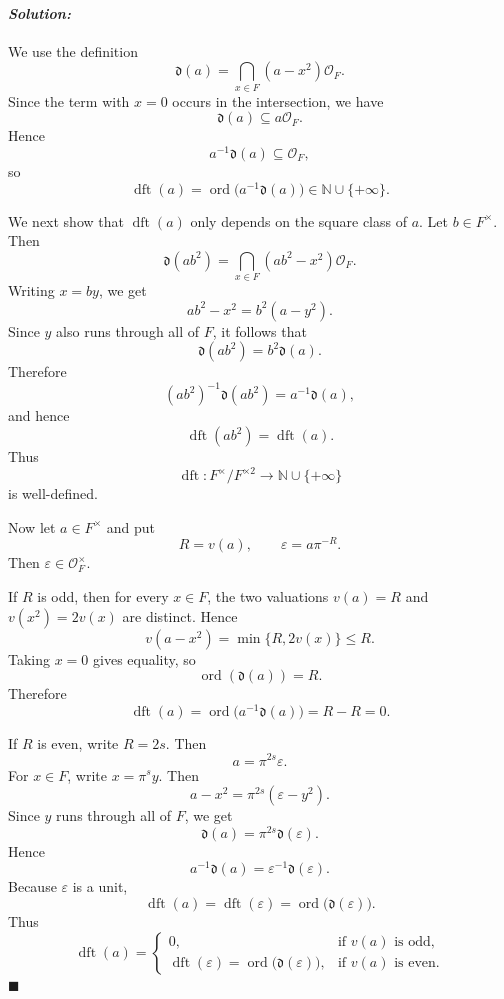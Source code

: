 \documentclass[12pt, a4paper]{article}
\newenvironment{solution}
  {\paragraph{\textit{Solution:}}\par\medskip}
  {\hfill$\blacksquare$\vspace{0.1cm}}
\begin{document}
\begin{solution}
We use the definition
\[
    \mathfrak d(a)=\bigcap_{x\in F}(a-x^2)\mathcal O_F .
\]
Since the term with $x=0$ occurs in the intersection, we have
\[
    \mathfrak d(a)\subseteq a\mathcal O_F.
\]
Hence
\[
    a^{-1}\mathfrak d(a)\subseteq \mathcal O_F,
\]
so
\[
    \operatorname{dft}(a)
    =
    \operatorname{ord}\bigl(a^{-1}\mathfrak d(a)\bigr)
    \in \mathbb N\cup\{+\infty\}.
\]

We next show that $\operatorname{dft}(a)$ only depends on the square class of
$a$. Let $b\in F^\times$. Then
\[
    \mathfrak d(ab^2)
    =
    \bigcap_{x\in F}(ab^2-x^2)\mathcal O_F.
\]
Writing $x=by$, we get
\[
    ab^2-x^2=b^2(a-y^2).
\]
Since $y$ also runs through all of $F$, it follows that
\[
    \mathfrak d(ab^2)=b^2\mathfrak d(a).
\]
Therefore
\[
    (ab^2)^{-1}\mathfrak d(ab^2)
    =
    a^{-1}\mathfrak d(a),
\]
and hence
\[
    \operatorname{dft}(ab^2)=\operatorname{dft}(a).
\]
Thus
\[
    \operatorname{dft}:F^\times/F^{\times 2}
    \longrightarrow
    \mathbb N\cup\{+\infty\}
\]
is well-defined.

Now let $a\in F^\times$ and put
\[
    R=v(a),\qquad \varepsilon=a\pi^{-R}.
\]
Then $\varepsilon\in\mathcal O_F^\times$.

If $R$ is odd, then for every $x\in F$, the two valuations $v(a)=R$ and
$v(x^2)=2v(x)$ are distinct. Hence
\[
    v(a-x^2)=\min\{R,2v(x)\}\leq R.
\]
Taking $x=0$ gives equality, so
\[
    \operatorname{ord}(\mathfrak d(a))=R.
\]
Therefore
\[
    \operatorname{dft}(a)
    =
    \operatorname{ord}\bigl(a^{-1}\mathfrak d(a)\bigr)
    =
    R-R
    =
    0.
\]

If $R$ is even, write $R=2s$. Then
\[
    a=\pi^{2s}\varepsilon.
\]
For $x\in F$, write $x=\pi^s y$. Then
\[
    a-x^2
    =
    \pi^{2s}(\varepsilon-y^2).
\]
Since $y$ runs through all of $F$, we get
\[
    \mathfrak d(a)=\pi^{2s}\mathfrak d(\varepsilon).
\]
Hence
\[
    a^{-1}\mathfrak d(a)
    =
    \varepsilon^{-1}\mathfrak d(\varepsilon).
\]
Because $\varepsilon$ is a unit,
\[
    \operatorname{dft}(a)
    =
    \operatorname{dft}(\varepsilon)
    =
    \operatorname{ord}\bigl(\mathfrak d(\varepsilon)\bigr).
\]
Thus
\[
    \operatorname{dft}(a)=
    \begin{cases}
        0, & \text{if } v(a) \text{ is odd},\\
        \operatorname{dft}(\varepsilon)
        =
        \operatorname{ord}\bigl(\mathfrak d(\varepsilon)\bigr),
        & \text{if } v(a) \text{ is even}.
    \end{cases}
\]
\end{solution}
\end{document}
